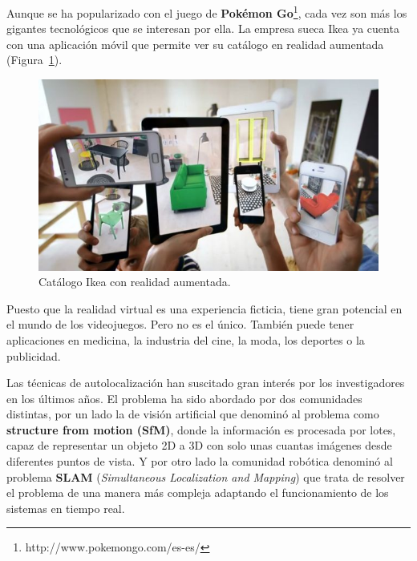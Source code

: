 Aunque se ha popularizado con el juego de \textbf{Pokémon Go}\footnote{http://www.pokemongo.com/es-es/}, cada vez son más los gigantes tecnológicos que se interesan por ella. La empresa sueca Ikea ya cuenta con una aplicación móvil que permite ver su catálogo en realidad aumentada (Figura~\ref{fig:Ikea}).

\begin{figure}[th]
\centering
\includegraphics[scale=0.7]{Figures/ikea.jpg}
\decoRule
\caption[Ikea con realidad aumentada]{Catálogo Ikea con realidad aumentada.}
\label{fig:Ikea}
\end{figure}

Puesto que la realidad virtual es una experiencia ficticia, tiene gran potencial en el mundo de los videojuegos. Pero no es el único. También puede tener aplicaciones en medicina, la industria del cine, la moda, los deportes o la publicidad.


Las técnicas de autolocalización han suscitado gran interés por los investigadores en los últimos años. El problema ha sido abordado por dos comunidades distintas, por un lado la de visión artificial que denominó al problema como \textbf{structure from motion (SfM)}, donde la información es procesada por lotes, capaz de representar un objeto 2D a 3D con solo unas cuantas imágenes desde diferentes puntos de vista. Y por otro lado la comunidad robótica denominó al problema \textbf{SLAM} (\textit{Simultaneous Localization and Mapping}) que trata de resolver el problema de una manera más compleja adaptando el funcionamiento de los sistemas en tiempo real.

